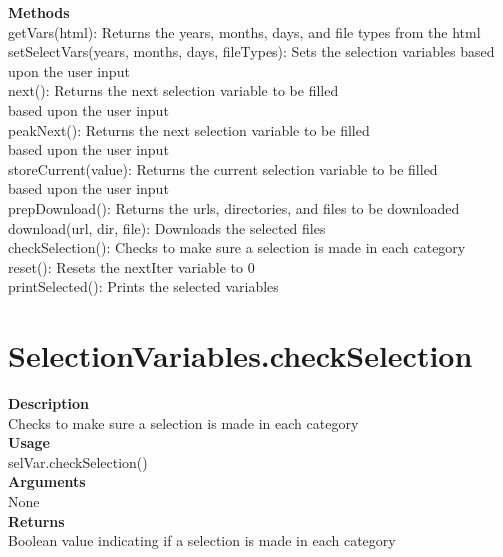 \documentclass[11pt, oneside]{article}
\begin{document}
\noindent\textbf{Methods} \\
        getVars(html): Returns the years, months, days, and file types from the html\\
        setSelectVars(years, months, days, fileTypes): Sets the selection variables based upon the user input\\
        next(): Returns the next selection variable to be filled\\
            based upon the user input\\
        peakNext(): Returns the next selection variable to be filled\\
            based upon the user input\\
        storeCurrent(value): Returns the current selection variable to be filled\\
            based upon the user input\\
        prepDownload(): Returns the urls, directories, and files to be downloaded\\
        download(url, dir, file): Downloads the selected files\\
        checkSelection(): Checks to make sure a selection is made in each category\\
        reset(): Resets the nextIter variable to 0\\
        printSelected(): Prints the selected variables\\

\newpage

\section{SelectionVariables.checkSelection}

\textbf{Description} \\
        Checks to make sure a selection is made in each category\\

\noindent\textbf{Usage} \\
        selVar.checkSelection() \\

\noindent\textbf{Arguments} \\
        None\\

\noindent\textbf{Returns} \\
        Boolean value indicating if a selection is made in each category\\
\end{document}
